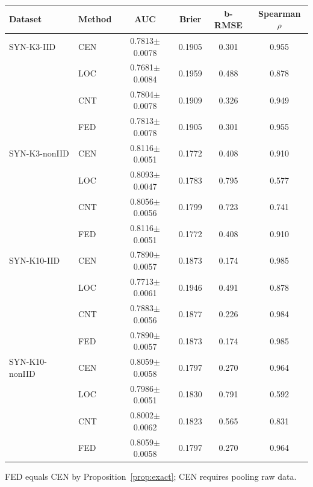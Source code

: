 \begin{widetable}
\centering
\caption{Synthetic data (D3): calibration utility without privacy, mean over seeds ($\pm$ s.d. for AUC). b-RMSE and $\rho$ are against the true difficulties.}
\label{tab:syn}
\small
\begin{tabular}{llcccc}
\toprule
Dataset & Method & AUC & Brier & b-RMSE & Spearman $\rho$ \\
\midrule
SYN-K3-IID & CEN & 0.7813$\pm$0.0078 & 0.1905 & 0.301 & 0.955 \\
 & LOC & 0.7681$\pm$0.0084 & 0.1959 & 0.488 & 0.878 \\
 & CNT & 0.7804$\pm$0.0078 & 0.1909 & 0.326 & 0.949 \\
 & FED & 0.7813$\pm$0.0078 & 0.1905 & 0.301 & 0.955 \\
\midrule
SYN-K3-nonIID & CEN & 0.8116$\pm$0.0051 & 0.1772 & 0.408 & 0.910 \\
 & LOC & 0.8093$\pm$0.0047 & 0.1783 & 0.795 & 0.577 \\
 & CNT & 0.8056$\pm$0.0056 & 0.1799 & 0.723 & 0.741 \\
 & FED & 0.8116$\pm$0.0051 & 0.1772 & 0.408 & 0.910 \\
\midrule
SYN-K10-IID & CEN & 0.7890$\pm$0.0057 & 0.1873 & 0.174 & 0.985 \\
 & LOC & 0.7713$\pm$0.0061 & 0.1946 & 0.491 & 0.878 \\
 & CNT & 0.7883$\pm$0.0056 & 0.1877 & 0.226 & 0.984 \\
 & FED & 0.7890$\pm$0.0057 & 0.1873 & 0.174 & 0.985 \\
\midrule
SYN-K10-nonIID & CEN & 0.8059$\pm$0.0058 & 0.1797 & 0.270 & 0.964 \\
 & LOC & 0.7986$\pm$0.0051 & 0.1830 & 0.791 & 0.592 \\
 & CNT & 0.8002$\pm$0.0062 & 0.1823 & 0.565 & 0.831 \\
 & FED & 0.8059$\pm$0.0058 & 0.1797 & 0.270 & 0.964 \\
\bottomrule
\end{tabular}
\par\smallskip\footnotesize FED equals CEN by Proposition~\ref{prop:exact}; CEN requires pooling raw data.
\end{widetable}
